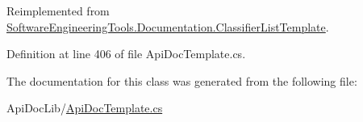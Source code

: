 Reimplemented from \hyperlink{class_software_engineering_tools_1_1_documentation_1_1_classifier_list_template_a119ae8eeb938465c5aaf44780e2f8876}{Software\+Engineering\+Tools.\+Documentation.\+Classifier\+List\+Template}.



Definition at line 406 of file Api\+Doc\+Template.\+cs.



The documentation for this class was generated from the following file\+:\begin{DoxyCompactItemize}
\item 
Api\+Doc\+Lib/\hyperlink{_api_doc_template_8cs}{Api\+Doc\+Template.\+cs}\end{DoxyCompactItemize}
